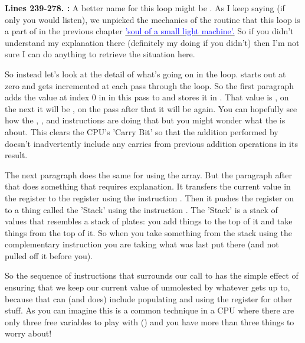 \textbf{Lines 239-278. :} A better name for this loop might be . As I keep saying (if only you would listen), we unpicked the mechanics
of the  routine that this loop is a
part of in the previous chapter
\hyperref[sec:listing_pattern]{\textcolor{blue}{'soul of a small light machine'.}} 
So if you didn't understand my explanation there (definitely my
doing if you didn't)
then I'm not sure I can do anything to retrieve the situation here.

So instead let's look at the detail of what's going on in the loop.  starts out at zero and gets incremented at
each pass through the loop. So the first paragraph adds the value at index 0 in  in this pass to 
and stores it in . That value is , on the next it will be , on the pass after that
it will be  again. You can hopefully see how the , , and  instructions are doing that
but you might wonder what the  is about. This clears the CPU's 'Carry Bit' so that the addition performed by 
doesn't inadvertently include any carries from previous addition operations in its result.

The next paragraph does the same for  using the  array. But the paragraph after
that does something that requires explanation. It transfers the current value in the  register to the  register
using the instruction . Then it pushes the  register on to a thing called the 'Stack' using the instruction
. The 'Stack' is a stack of values that resembles a stack of plates: you add things to the top of it and take things
from the top of it. So when you take something from the stack using the complementary instruction  you are taking
what was last put there (and not pulled off it before you).

So the  sequence of instructions that surrounds our call to  has the
simple effect of ensuring that we keep our current value of  unmolested by whatever 
gets up to, because that can (and does) include populating and using the  register for other stuff. As you can imagine
this is a common technique in a CPU where there are only three free variables to play with () and you have more than three things
to worry about!

